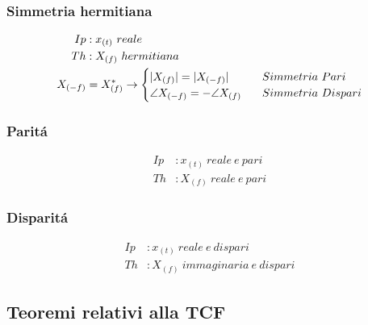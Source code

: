         \subsubsection{Simmetria hermitiana}\label{Simmetria Hermitiana}
            \begin{align}
                Ip&: x_{(t)}\ reale \nonumber \\
                Th&: X_{(f)}\ hermitiana \nonumber \\ 
                X_{(-f)} &= X_{(f)}^{*} \rightarrow
                    \begin{cases}
                        |X_{(f)}| = |X_{(-f)}| \hspace{0.3cm} & Simmetria\ Pari \\
                        \angle X_{(-f)} = -\angle X_{(f)}\hspace{0.3cm} & Simmetria\ Dispari
                    \end{cases} \nonumber
            \end{align}

        \subsubsection{Paritá}\label{Parita}
            \begin{align}
                Ip&: x_{(t)}\ reale\ e\ pari  \nonumber \\
                Th&: X_{(f)}\ reale\ e\ pari \nonumber  
            \end{align}

        \subsubsection{Disparitá}\label{Disparita}
            \begin{align}
                Ip&: x_{(t)}\ reale\ e\ dispari  \nonumber \\
                Th&: X_{(f)}\ immaginaria\ e\ dispari \nonumber 
            \end{align}

    \subsection{Teoremi relativi alla TCF}
